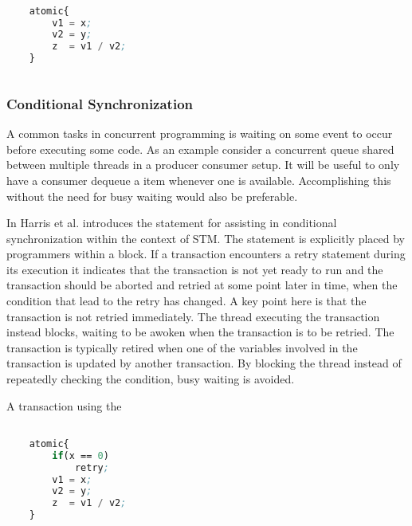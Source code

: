 \begin{lstlisting}[label=lst:stm_atomic_block,
  caption={The atomic block},
  language=Lisp,  
  showspaces=false,
  showtabs=false,
  breaklines=true,
  showstringspaces=false,
  breakatwhitespace=true,
  commentstyle=\color{greencomments},
  keywordstyle=\color{bluekeywords},
  stringstyle=\color{redstrings},
  morekeywords={atomic}]  % Start your code-block

	atomic{
		v1 = x;
		v2 = y;
		z  = v1 / v2;	
	}
       
\end{lstlisting}

\subsubsection{Conditional Synchronization}
A common tasks in concurrent programming is waiting on some event to occur before executing some code. As an example consider a concurrent queue shared between multiple threads in a producer consumer setup. It will be useful to only have a consumer dequeue a item whenever one is available. Accomplishing this without the need for busy waiting would also be preferable.

In \cite{harris2005composable} Harris et al. introduces the  statement for assisting in conditional synchronization within the context of \ac{STM}. The  statement is explicitly placed by programmers within a  block. If a transaction encounters a retry statement during its execution it indicates that the transaction is not yet ready to run and the transaction should be aborted and retried at some point later in time, when the condition that lead to the retry has changed\cite[p. 73]{harris2010transactional}. A key point here is that the transaction is not retried immediately. The thread executing the transaction instead blocks, waiting to be awoken when the transaction is to be retried. The transaction is typically retired when one of the variables involved in the transaction is updated by another transaction\cite[p. 51]{harris2005composable}. By blocking the thread instead of repeatedly checking the condition, busy waiting is avoided.

A transaction using the 

\begin{lstlisting}[label=lst:stm_retry,
  caption={The retry statement},
  language=Lisp,  
  showspaces=false,
  showtabs=false,
  breaklines=true,
  showstringspaces=false,
  breakatwhitespace=true,
  commentstyle=\color{greencomments},
  keywordstyle=\color{bluekeywords},
  stringstyle=\color{redstrings},
  morekeywords={atomic, retry}]  % Start your code-block

	atomic{
		if(x == 0)
			retry;
		v1 = x;
		v2 = y;
		z  = v1 / v2;	
	}
       
\end{lstlisting}



